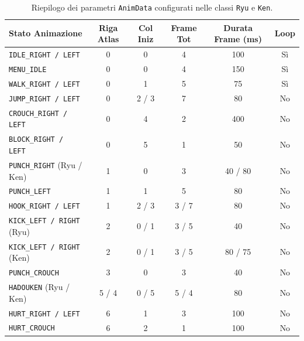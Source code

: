 \documentclass[11pt, a4paper]{article}
\begin{document}
\begin{table}[htbp]
\centering
\begin{tabular}{l c c c c c}
\toprule
\textbf{Stato Animazione } & \textbf{Riga Atlas} & \textbf{Col Iniz} & \textbf{Frame Tot} & \textbf{Durata Frame (ms)} & \textbf{Loop} \\
\midrule
\texttt{IDLE\_RIGHT / LEFT} & 0 & 0 & 4 & 100 & Sì \\
\texttt{MENU\_IDLE} & 0 & 0 & 4 & 150 & Sì \\
\texttt{WALK\_RIGHT / LEFT} & 0 & 1 & 5 & 75 & Sì \\
\texttt{JUMP\_RIGHT / LEFT} & 0 & 2 / 3 & 7 & 80 & No \\
\texttt{CROUCH\_RIGHT / LEFT} & 0 & 4 & 2 & 400 & No \\
\texttt{BLOCK\_RIGHT / LEFT} & 0 & 5 & 1 & 50 & No \\
\texttt{PUNCH\_RIGHT} (Ryu / Ken) & 1 & 0 & 3 & 40 / 80 & No \\
\texttt{PUNCH\_LEFT} & 1 & 1 & 5 & 80 & No \\
\texttt{HOOK\_RIGHT / LEFT} & 1 & 2 / 3 & 3 / 7 & 80 & No \\
\texttt{KICK\_LEFT / RIGHT} (Ryu) & 2 & 0 / 1 & 3 / 5 & 40 & No \\
\texttt{KICK\_LEFT / RIGHT} (Ken) & 2 & 0 / 1 & 3 / 5 & 80 / 75 & No \\
\texttt{PUNCH\_CROUCH} & 3 & 0 & 3 & 40 & No \\
\texttt{HADOUKEN} (Ryu / Ken) & 5 / 4 & 0 / 5 & 5 / 4 & 80 & No \\
\texttt{HURT\_RIGHT / LEFT} & 6 & 1 & 3 & 100 & No \\
\texttt{HURT\_CROUCH} & 6 & 2 & 1 & 100 & No \\
\bottomrule
\end{tabular}
\caption{Riepilogo dei parametri \texttt{AnimData} configurati nelle classi \texttt{Ryu} e \texttt{Ken}.}
\label{tab:framedata}
\end{table}
\end{document}
